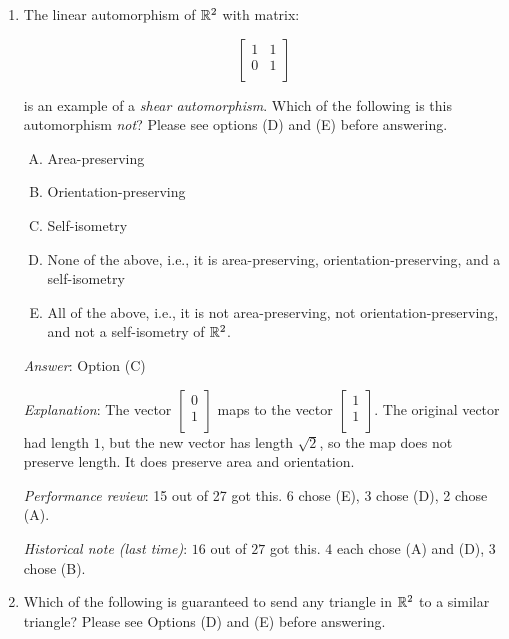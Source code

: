 \documentclass[10pt]{amsart}
\begin{document}
\begin{enumerate}
  {\em Performance review}: 20 out of 27 got this. 6 chose (C), 1 left
  the question blank.

  {\em Historical note (last time)}: $24$ out of $27$ got this. $2$ chose (B),
  $1$ chose (C).
\item The linear automorphism of $\mathbb{R}^2$ with matrix:

  $$\left[\begin{matrix} 1 & 1 \\ 0 & 1 \\\end{matrix}\right]$$

  is an example of a {\em shear automorphism}. Which of the following
  is this automorphism {\em not}? Please see options (D) and (E)
  before answering.

  \begin{enumerate}[(A)]
  \item Area-preserving
  \item Orientation-preserving
  \item Self-isometry
  \item None of the above, i.e., it is area-preserving,
    orientation-preserving, and a self-isometry
  \item All of the above, i.e., it is not area-preserving, not
    orientation-preserving, and not a self-isometry of $\mathbb{R}^2$.
  \end{enumerate}

  {\em Answer}: Option (C)

  {\em Explanation}: The vector $\left[\begin{matrix} 0 \\ 1
      \\\end{matrix}\right]$ maps to the vector $\left[\begin{matrix}
      1 \\ 1 \\\end{matrix}\right]$. The original vector had length
  $1$, but the new vector has length $\sqrt{2}$, so the map does not
  preserve length. It does preserve area and orientation.

  {\em Performance review}: 15 out of 27 got this. 6 chose (E), 3
  chose (D), 2 chose (A).

  {\em Historical note (last time)}: $16$ out of $27$ got this. $4$ each chose
  (A) and (D), $3$ chose (B).

\item Which of the following is guaranteed to send any triangle in
  $\mathbb{R}^2$ to a similar triangle? Please see Options (D) and (E) before
  answering.


\end{enumerate}
\end{document}
